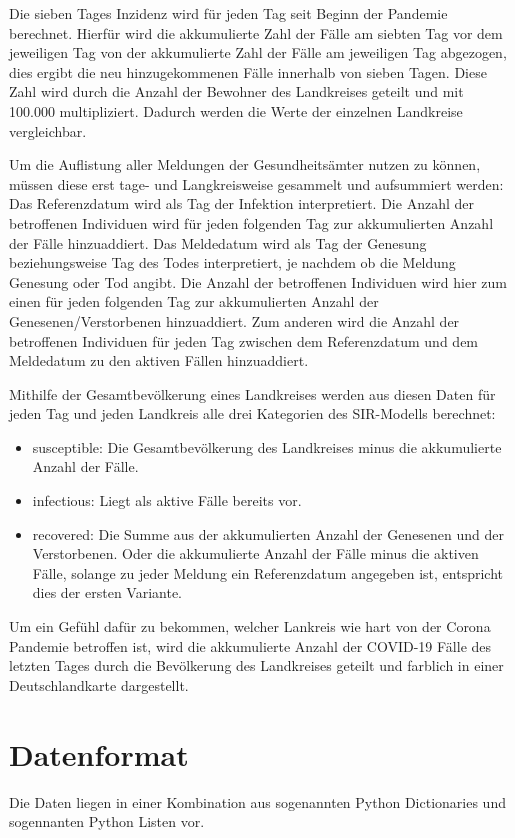 Die sieben Tages Inzidenz wird für jeden Tag seit Beginn der Pandemie berechnet. Hierfür wird die akkumulierte Zahl der Fälle am siebten Tag vor dem jeweiligen Tag von der akkumulierte Zahl der Fälle am jeweiligen Tag abgezogen, dies ergibt die neu hinzugekommenen Fälle innerhalb von sieben Tagen.
Diese Zahl wird durch die Anzahl der Bewohner des Landkreises geteilt und mit 100.000 multipliziert. Dadurch werden die Werte der einzelnen Landkreise vergleichbar. 

Um die Auflistung aller Meldungen der Gesundheitsämter nutzen zu können, müssen diese erst tage- und Langkreisweise gesammelt und aufsummiert werden:
Das Referenzdatum wird als Tag der Infektion interpretiert. Die Anzahl der betroffenen Individuen wird für jeden folgenden Tag zur akkumulierten Anzahl der Fälle hinzuaddiert.
Das Meldedatum wird als Tag der Genesung beziehungsweise Tag des Todes interpretiert, je nachdem ob die Meldung Genesung oder Tod angibt. Die Anzahl der betroffenen Individuen wird hier zum einen für jeden folgenden Tag zur akkumulierten Anzahl der Genesenen/Verstorbenen hinzuaddiert. Zum anderen wird die Anzahl der betroffenen Individuen für jeden Tag zwischen dem Referenzdatum und dem Meldedatum zu den aktiven Fällen hinzuaddiert.

Mithilfe der Gesamtbevölkerung eines Landkreises werden aus diesen Daten für jeden Tag und jeden Landkreis alle drei Kategorien des SIR-Modells berechnet:
\begin{itemize}
    \item \glqq{}susceptible\grqq{}: Die Gesamtbevölkerung des Landkreises minus die akkumulierte Anzahl der Fälle.
    \item \glqq{}infectious\grqq{}: Liegt als aktive Fälle bereits vor.
    \item \glqq{}recovered\grqq{}:
    Die Summe aus der akkumulierten Anzahl der Genesenen und der Verstorbenen. Oder die akkumulierte Anzahl der Fälle minus die aktiven Fälle, solange zu jeder Meldung ein Referenzdatum angegeben ist, entspricht dies der ersten Variante.
\end{itemize}

Um ein Gefühl dafür zu bekommen, welcher Lankreis wie hart von der Corona Pandemie betroffen ist, wird die akkumulierte Anzahl der COVID-19 Fälle des letzten Tages durch die Bevölkerung des Landkreises geteilt und farblich in einer Deutschlandkarte dargestellt.

\section{Datenformat}
Die Daten liegen in einer Kombination aus sogenannten Python Dictionaries und sogennanten Python Listen vor.


